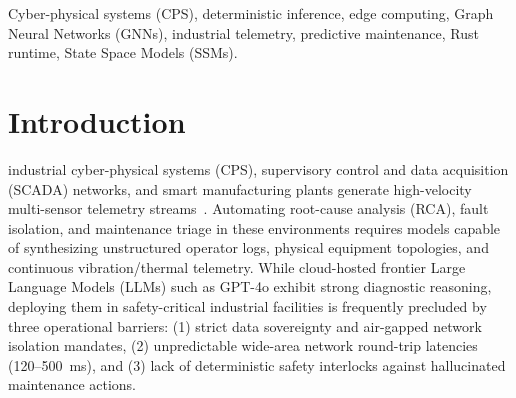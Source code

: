\documentclass[journal]{IEEEtran}
\begin{document}
\begin{IEEEkeywords}
Cyber-physical systems (CPS), deterministic inference, edge computing, Graph Neural Networks (GNNs), industrial telemetry, predictive maintenance, Rust runtime, State Space Models (SSMs).
\end{IEEEkeywords}

\section{Introduction}

 industrial cyber-physical systems (CPS), supervisory control and data acquisition (SCADA) networks, and smart manufacturing plants generate high-velocity multi-sensor telemetry streams~\cite{lee2015cps,iso13374}. Automating root-cause analysis (RCA), fault isolation, and maintenance triage in these environments requires models capable of synthesizing unstructured operator logs, physical equipment topologies, and continuous vibration/thermal telemetry. While cloud-hosted frontier Large Language Models (LLMs) such as GPT-4o exhibit strong diagnostic reasoning, deploying them in safety-critical industrial facilities is frequently precluded by three operational barriers: (1) strict data sovereignty and air-gapped network isolation mandates, (2) unpredictable wide-area network round-trip latencies (120--500~ms), and (3) lack of deterministic safety interlocks against hallucinated maintenance actions.
\end{document}
